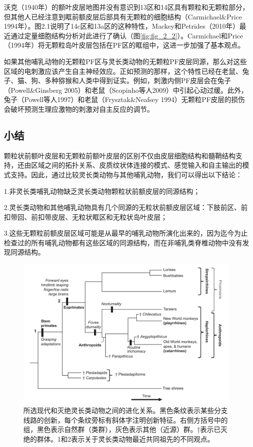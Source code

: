 沃克（1940年）的额叶皮层地图并没有意识到13区和14区具有颗粒和无颗粒部分，但其他人已经注意到眶前额皮层后部具有无颗粒的细胞结构（Carmichael\&Price 1994年）。图2.1说明了14c区和13a区的这种特性，Mackey和Petrides（2010年）最近通过定量细胞结构分析对此进行了确认（图\ref{fig:fig_2_2}）。Carmichael和Price（1994年）将无颗粒岛叶皮层包括在PF区的眶组中，这进一步加强了基本观点。

如果其他哺乳动物的无颗粒PF区与灵长类动物的无颗粒PF皮层同源，那么对这些区域的电刺激应该产生自主神经效应。正如预测的那样，这个特性已经在老鼠、兔子、猫、狗、多种猕猴和人类中得到证实。例如，刺激内侧PF皮层会在兔子（Powell\&Ginsberg 2005）和老鼠（Scopinho等人2009）中引起心动过缓。此外，兔子（Powell等人1997）和老鼠（Frysztak\&Neafsey 1994）无颗粒PF皮层的损伤会破坏预测生理应激物的刺激对自主反应的调节。

\subsection{小结}
颗粒状前额叶皮层和无颗粒前额叶皮层的区别不仅由皮层细胞结构和髓鞘结构支持，还由区域之间的拓扑关系、皮质纹状体连接的模式、感觉输入和自主输出的模式支持。因此，通过比较灵长类动物与其他哺乳动物，我们可以得出以下结论：\par
1.非灵长类哺乳动物缺乏灵长类动物颗粒状前额皮层的同源结构；\par
2.灵长类动物和其他哺乳动物具有几个同源的无粒状前额皮层区域：下肢前区、前扣带回、前扣带皮层、无粒状眶区和无粒状岛叶皮层；\par
3.这些无颗粒前额皮层区域可能是从最早的哺乳动物所演化出来的，因为迄今为止检查过的所有哺乳动物都有这些区域的同源结构，而在非哺乳类脊椎动物中没有发现同源结构。

\begin{figure}[!htb]
	\centering
	\includegraphics[width=0.8\linewidth]{image_pfc/Fig_2_5}
	\caption*{所选现代和灭绝灵长类动物之间的进化关系。黑色条纹表示某些分支线路的创新，每个条纹旁标有斜体字注明创新特征。右侧方括号中的组，黑色表示自然群（类群），灰色表示其他（近源）群。†表示已灭绝的群体。1和2表示关于灵长类动物最近共同祖先的不同观点。\label{fig:fig_2_5}}
\end{figure}

